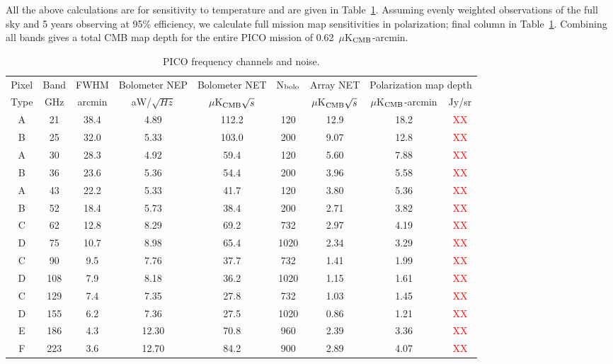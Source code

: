 \documentclass[]{spie}  %
\newcommand{\comr}[1]{\textcolor{red}{#1}}
\begin{document}
All the above calculations are for sensitivity to temperature and are given in Table~\ref{tab:noise}.  Assuming evenly weighted observations 
of the full sky and 5 years observing at 95\% efficiency, we calculate full mission map sensitivities in polarization; final column in Table~\ref{tab:noise}.
Combining all bands gives a total CMB map depth for the entire PICO mission of 0.62~$\mu$K$_{\rm CMB}$-arcmin.

\begin{table}[ht]
\centering
\caption{PICO frequency channels and noise. }
\label{tab:noise}
\begin{tabular}{|c|c|c|c|c|c|c|cc|}
\hline
Pixel  & Band  & FWHM   & Bolometer NEP & Bolometer NET        & N$_{\rm bolo}$ & Array NET            & \multicolumn{2}{|c|}{Polarization map depth}  \\
Type   & GHz   & arcmin & aW/$\sqrt{Hz}$ & $\mu$K$_{\rm CMB}\sqrt{s}$ &           & $\mu$K$_{\rm CMB}\sqrt{s}$ & $\mu$K$_{\rm CMB}$-arcmin & Jy/sr     \\ \hline
A     & 21  & 38.4 & 4.89  & 112.2   & 120   & 12.9  & 18.2  & \comr{XX} \\
B     & 25  & 32.0 & 5.33  & 103.0   & 200   & 9.07   & 12.8 & \comr{XX}  \\
A     & 30  & 28.3 & 4.92  & 59.4    & 120   & 5.60   & 7.88 & \comr{XX}   \\
B     & 36  & 23.6 & 5.36  & 54.4    & 200   & 3.96   & 5.58 & \comr{XX}   \\
A     & 43  & 22.2 & 5.33  & 41.7    & 120   & 3.80   & 5.36 & \comr{XX}   \\
B     & 52  & 18.4 & 5.73  & 38.4    & 200   & 2.71   & 3.82 & \comr{XX}   \\
C     & 62  & 12.8 & 8.29  & 69.2    & 732   & 2.97   & 4.19 & \comr{XX}   \\
D     & 75  & 10.7 & 8.98  & 65.4    & 1020  & 2.34   & 3.29 & \comr{XX}   \\
C     & 90  & 9.5  & 7.76  & 37.7    & 732   & 1.41   & 1.99 & \comr{XX}   \\
D     & 108 & 7.9  & 8.18  & 36.2    & 1020  & 1.15   & 1.61 & \comr{XX}   \\
C     & 129 & 7.4  & 7.35  & 27.8    & 732   & 1.03   & 1.45 & \comr{XX}   \\
D     & 155 & 6.2  & 7.36  & 27.5    & 1020  & 0.86   & 1.21 & \comr{XX}   \\
E     & 186 & 4.3  & 12.30 & 70.8    & 960   & 2.39   & 3.36 & \comr{XX}   \\
F     & 223 & 3.6  & 12.70 & 84.2    & 900   & 2.89   & 4.07 & \comr{XX}   \\

\end{tabular}
\end{table}
\end{document}
